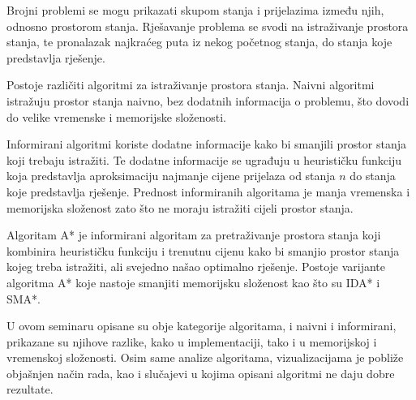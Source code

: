 Brojni problemi se mogu prikazati skupom stanja i prijelazima između njih, odnosno prostorom stanja. 
Rješavanje problema se svodi na istraživanje prostora stanja, te pronalazak najkraćeg puta iz nekog početnog stanja, do stanja koje predstavlja rješenje.

Postoje različiti algoritmi za istraživanje prostora stanja. 
Naivni algoritmi istražuju prostor stanja naivno, bez dodatnih informacija o problemu, što dovodi do velike vremenske i memorijske složenosti.

Informirani algoritmi koriste dodatne informacije kako bi smanjili prostor stanja koji trebaju istražiti.
Te dodatne informacije se ugrađuju u heurističku funkciju koja predstavlja aproksimaciju najmanje cijene prijelaza od stanja \( n \) do stanja koje predstavlja rješenje.
Prednost informiranih algoritama je manja vremenska i memorijska složenost zato što ne moraju istražiti cijeli prostor stanja.

Algoritam A* je informirani algoritam za pretraživanje prostora stanja koji kombinira heurističku funkciju i trenutnu cijenu kako bi smanjio prostor stanja kojeg treba istražiti, ali svejedno našao optimalno rješenje.
Postoje varijante algoritma A* koje nastoje smanjiti memorijsku složenost kao što su IDA* i SMA*.

U ovom seminaru opisane su obje kategorije algoritama, i naivni i informirani, prikazane su njihove razlike, kako u implementaciji, tako i u memorijskoj i vremenskoj složenosti. Osim same analize algoritama, vizualizacijama je pobliže objašnjen način rada, kao i slučajevi u kojima opisani algoritmi ne daju dobre rezultate.